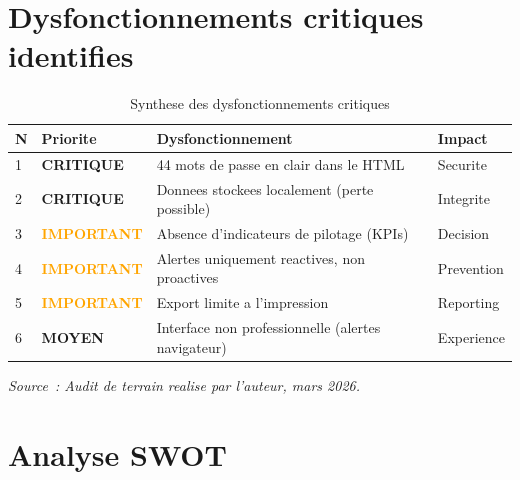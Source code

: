 \documentclass[12pt,a4paper,openany]{report}
\begin{document}
\section{Dysfonctionnements critiques identifies}

\begin{table}[H]
\centering
\caption{Synthese des dysfonctionnements critiques}
\label{tab:dysfonctionnements}
\begin{tabularx}{\textwidth}{llXl}
\toprule
\textbf{N} & \textbf{Priorite} & \textbf{Dysfonctionnement} & \textbf{Impact}\\
\midrule
1 & \textcolor{rougeKO}{\bfseries CRITIQUE} & 44 mots de passe en clair dans le HTML & Securite\\
2 & \textcolor{rougeKO}{\bfseries CRITIQUE} & Donnees stockees localement (perte possible) & Integrite\\
3 & \textcolor{orange}{\bfseries IMPORTANT} & Absence d'indicateurs de pilotage (KPIs) & Decision\\
4 & \textcolor{orange}{\bfseries IMPORTANT} & Alertes uniquement reactives, non proactives & Prevention\\
5 & \textcolor{orange}{\bfseries IMPORTANT} & Export limite a l'impression & Reporting\\
6 & \textcolor{vertOK}{\bfseries MOYEN} & Interface non professionnelle (alertes navigateur) & Experience\\
\bottomrule
\end{tabularx}
\vspace{0.1cm}
\small\textit{Source~: Audit de terrain realise par l'auteur, mars 2026.}
\end{table}

\section{Analyse SWOT}
\end{document}
